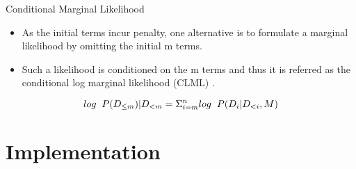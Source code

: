 \documentclass[t, aspectratio=169]{beamer}
\begin{document}

 \begin{frame}{Conditional Marginal Likelihood}
 \vspace{0.7cm}
  \begin{itemize}
      \item As the initial terms incur penalty, one alternative is to formulate a marginal likelihood by omitting the initial m terms. 
       \vspace{0.5cm}
      \item Such a likelihood is conditioned on the m terms and thus it is referred as the conditional log marginal likelihood (CLML) \cite{Lofti}.


  \end{itemize}
  
  \vspace{1.5cm}
  \[log \hspace{0.2cm}P(D_{\leq m})|D_{< m} = \Sigma_{i = m}^n log\hspace{0.2cm} P(D_i|D_{<i}, M)\]

 \end{frame}  
 


\section{Implementation} 

\end{document}
